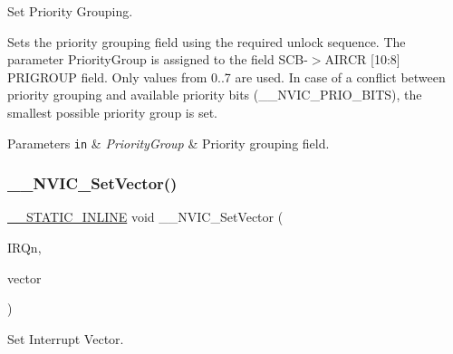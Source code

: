 Set Priority Grouping. 

Sets the priority grouping field using the required unlock sequence. The parameter Priority\+Group is assigned to the field S\+C\+B-\/$>$A\+I\+R\+CR \mbox{[}10\+:8\mbox{]} P\+R\+I\+G\+R\+O\+UP field. Only values from 0..7 are used. In case of a conflict between priority grouping and available priority bits (\+\_\+\+\_\+\+N\+V\+I\+C\+\_\+\+P\+R\+I\+O\+\_\+\+B\+I\+TS), the smallest possible priority group is set. 
\begin{DoxyParams}[1]{Parameters}
\mbox{\tt in}  & {\em Priority\+Group} & Priority grouping field. \\
\hline
\end{DoxyParams}
\mbox{\label{group___c_m_s_i_s___core___n_v_i_c_functions_ga0df355460bc1783d58f9d72ee4884208}} 
\subsubsection{\texorpdfstring{\+\_\+\+\_\+\+N\+V\+I\+C\+\_\+\+Set\+Vector()}{\_\_NVIC\_SetVector()}}
{\footnotesize\ttfamily \mbox{\hyperlink{cmsis__iccarm_8h_aba87361bfad2ae52cfe2f40c1a1dbf9c}{\+\_\+\+\_\+\+S\+T\+A\+T\+I\+C\+\_\+\+I\+N\+L\+I\+NE}} void \+\_\+\+\_\+\+N\+V\+I\+C\+\_\+\+Set\+Vector (\begin{DoxyParamCaption}\item[{\mbox{\hyperlink{group___interrupt__vector__numbers_gac3af4a32370fb28c4ade8bf2add80251}{I\+R\+Qn\+\_\+\+Type}}}]{I\+R\+Qn,  }\item[{uint32\+\_\+t}]{vector }\end{DoxyParamCaption})}



Set Interrupt Vector. 

